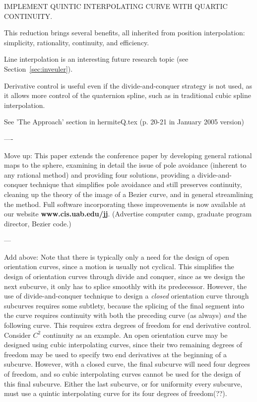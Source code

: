\documentclass[12pt]{article}
\begin{document}
IMPLEMENT QUINTIC INTERPOLATING CURVE WITH QUARTIC CONTINUITY.

This reduction brings several benefits, all inherited from position interpolation:
simplicity, rationality, continuity, and efficiency.

Line interpolation is an interesting future research topic 
(see Section~\ref{sec:inveuler}).

Derivative control is useful even if the divide-and-conquer strategy is not used,
as it allows more control of the quaternion spline, such as in traditional cubic spline
interpolation.

See 'The Approach' section in hermiteQ.tex (p. 20-21 in January 2005 version)

----

Move up:
This paper extends the conference paper \cite{jjwilliams95} by developing
general rational maps to the sphere, examining in detail the issue of pole avoidance
(inherent to any rational method) and providing four solutions, 
providing a divide-and-conquer technique that simplifies pole avoidance and
still preserves continuity, cleaning up the theory of the image of a Bezier curve,
and in general streamlining the method.
Full software incorporating these improvements is now available at our website
{\bf www.cis.uab.edu/jj}.
(Advertise computer camp, graduate program director, Bezier code.)

---

Add above:
Note that there is typically only a need for the design of open orientation curves,
since a motion is usually not cyclical.
This simplifies the design of orientation curves through divide and conquer,
since as we design the next subcurve, it only has to splice smoothly with its predecessor.
However, the use of divide-and-conquer technique to design a {\em closed} orientation
curve through subcurves requires some subtlety,
because the splicing of the final segment into the curve requires continuity
with both the preceding curve (as always) {\em and} the following curve.
This requires extra degrees of freedom for end derivative control.
Consider $C^2$ continuity as an example.
An open orientation curve may be designed using cubic interpolating curves,
since their two remaining degrees of freedom may be used to specify two end derivatives
at the beginning of a subcurve.
However, with a closed curve, 
the final subcurve will need four degrees of freedom, and so cubic interpolating
curves cannot be used for the design of this final subcurve.
Either the last subcurve, or for uniformity every subcurve, must use a quintic 
interpolating curve for its four degrees of freedom(??).
\end{document}

